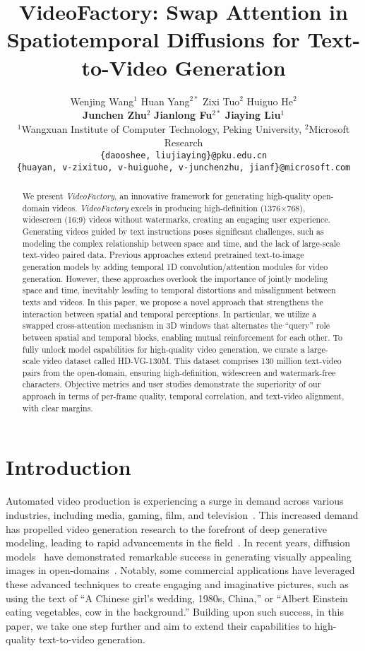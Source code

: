 \documentclass{article}
\title{VideoFactory: Swap Attention in Spatiotemporal Diffusions for Text-to-Video Generation}
\author{
Wenjing Wang$^1$ \quad Huan Yang$^{2*}$ \quad Zixi Tuo$^2$ \quad Huiguo He$^2$ \\ \textbf{Junchen Zhu}$^2$ \quad \textbf{Jianlong Fu}$^{2*}$ \quad \textbf{Jiaying Liu}$^1$ \\
$^1$Wangxuan Institute of Computer Technology, Peking University, $^2$Microsoft Research\\
\texttt{\{daooshee, liujiaying\}@pku.edu.cn}\\
\texttt{\{huayan, v-zixituo, v-huiguohe, v-junchenzhu, jianf\}@microsoft.com}\\
}
\begin{document}
\maketitle

\begin{abstract}
We present \textit{VideoFactory}, an innovative framework for generating high-quality open-domain videos.
\textit{VideoFactory} excels in producing high-definition (1376$\times$768), widescreen (16:9) videos without watermarks, creating an engaging user experience.
Generating videos guided by text instructions poses significant challenges, such as modeling the complex relationship between space and time, and the lack of large-scale text-video paired data. Previous approaches extend pretrained text-to-image generation models by adding temporal 1D convolution/attention modules for video generation.
However, these approaches overlook the importance of jointly modeling space and time, inevitably leading to temporal distortions and misalignment between texts and videos. In this paper, we propose a novel approach that strengthens the interaction between spatial and temporal perceptions. In particular, we utilize a swapped cross-attention mechanism in 3D windows that alternates the ``query'' role between spatial and temporal blocks, enabling mutual reinforcement for each other. 
To fully unlock model capabilities for high-quality video generation, we curate a large-scale video dataset called HD-VG-130M. This dataset comprises 130 million text-video pairs from the open-domain, ensuring high-definition, widescreen and watermark-free characters.
Objective metrics and user studies demonstrate the superiority of our approach in terms of per-frame quality, temporal correlation, and text-video alignment, with clear margins. 
\end{abstract}

\section{Introduction}
\label{sec:introduction}

Automated video production is experiencing a surge in demand across various industries, including media, gaming, film, and television~\cite{2017_DigiPro,2021_Playable}. This increased demand has propelled video generation research to the forefront of deep generative modeling, leading to rapid advancements in the field~\cite{2022_VDM, 2016_VG_ICLR, 2017TGAN,2018MoCoGAN, 2016_VG_NIPS}. In recent years, diffusion models~\cite{2020DDPM} have demonstrated remarkable success in generating visually appealing images in open-domains~\cite{2022LDM,imagen}. Notably, some commercial applications have leveraged these advanced techniques to create engaging and imaginative pictures, such as using the text of ``A Chinese girl's wedding, 1980s, China,'' or ``Albert Einstein eating vegetables, cow in the background.'' 
Building upon such success, in this paper, we take one step further and aim to extend their capabilities to high-quality text-to-video generation.
\end{document}
